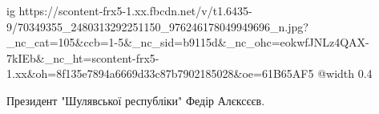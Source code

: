  
 
 
 
 

\ifcmt
  ig https://scontent-frx5-1.xx.fbcdn.net/v/t1.6435-9/70349355_2480313292251150_976246178049949696_n.jpg?_nc_cat=105&ccb=1-5&_nc_sid=b9115d&_nc_ohc=eokwfJNLz4QAX-7kIEb&_nc_ht=scontent-frx5-1.xx&oh=8f135e7894a6669d33c87b7902185028&oe=61B65AF5
  @width 0.4
\fi


Президент "Шулявської республіки" Федір Алєксєєв.
